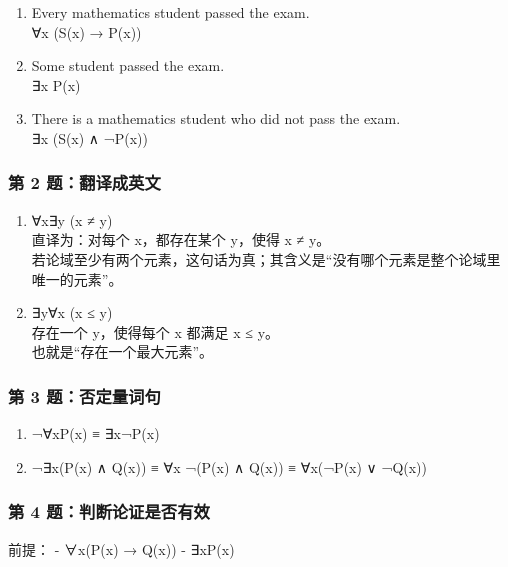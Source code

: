 \documentclass[
  11pt,
]{article}
\providecommand{\tightlist}{%
  \setlength{\itemsep}{0pt}\setlength{\parskip}{0pt}}
\begin{document}
\begin{enumerate}
\def\labelenumi{\arabic{enumi}.}
\item
  Every mathematics student passed the exam.\\
  ∀x (S(x) → P(x))
\item
  Some student passed the exam.\\
  ∃x P(x)
\item
  There is a mathematics student who did not pass the exam.\\
  ∃x (S(x) ∧ ¬P(x))
\end{enumerate}

\subsubsection{第 2
题：翻译成英文}\label{ux7b2c-2-ux9898ux7ffbux8bd1ux6210ux82f1ux6587}

\begin{enumerate}
\def\labelenumi{\arabic{enumi}.}
\item
  ∀x∃y (x ≠ y)\\
  直译为：对每个 x，都存在某个 y，使得 x ≠ y。\\
  若论域至少有两个元素，这句话为真；其含义是``没有哪个元素是整个论域里唯一的元素''。
\item
  ∃y∀x (x ≤ y)\\
  存在一个 y，使得每个 x 都满足 x ≤ y。\\
  也就是``存在一个最大元素''。
\end{enumerate}

\subsubsection{第 3
题：否定量词句}\label{ux7b2c-3-ux9898ux5426ux5b9aux91cfux8bcdux53e5}

\begin{enumerate}
\def\labelenumi{\arabic{enumi}.}
\tightlist
\item
  ¬∀xP(x) ≡ ∃x¬P(x)
\item
  ¬∃x(P(x) ∧ Q(x)) ≡ ∀x ¬(P(x) ∧ Q(x)) ≡ ∀x(¬P(x) ∨ ¬Q(x))
\end{enumerate}

\subsubsection{第 4
题：判断论证是否有效}\label{ux7b2c-4-ux9898ux5224ux65adux8bbaux8bc1ux662fux5426ux6709ux6548}

前提： - ∀x(P(x) → Q(x)) - ∃xP(x)
\end{document}
